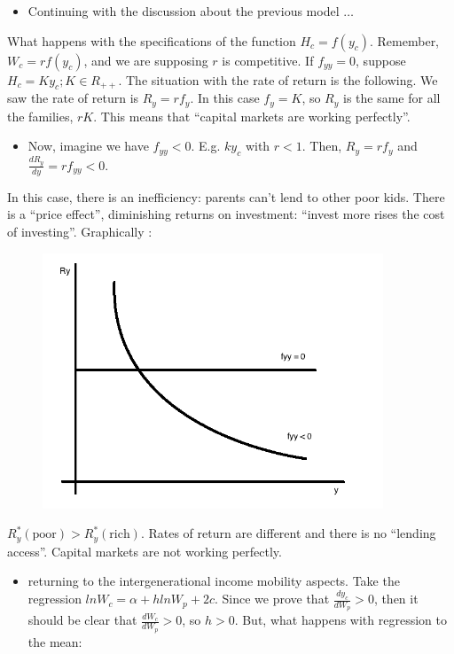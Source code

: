 \documentclass[14pt,notitlepage]{article}
\begin{document}
\begin{itemize}
    \begin{itemize}
    \item Continuing with the discussion about the previous model $\ldots$
    \end{itemize}
What happens with the specifications of the function $H_c = f(y_c)$. Remember, $W_c = r f(y_c)$, and we are supposing $r$ is competitive.
If $f_{yy} = 0$, suppose $H_c = K y_c ; K \in R_{++}$. The situation with the rate of return is the following. We saw the rate of return is $R_y = r f_y$. In this case $f_y = K$, so $R_y$ is the same for all the families, $rK$.
This means that ``capital markets are working perfectly''.
    \begin{itemize}
    \item Now, imagine we have $f_{yy} < 0$. E.g. $k y_c$ with $r < 1$. Then, $R_y = r f_y$ and $\frac{dR_y}{dy} = r f_{yy} < 0$.
    \end{itemize}
In this case, there is an inefficiency: parents can't lend to other poor kids. There is a ``price effect'', diminishing returns on investment: ``invest more rises the cost of investing''. Graphically :

\begin{center}
\begin{figure}[H] 
\caption{}
\centering
\includegraphics[width=4in, height=3in]{plot3.png}
\end{figure}
\end{center}


$R^{*}_y (\text{poor}) > R^{*}_y (\text{rich})$. Rates of return are different and there is no ``lending access''. Capital markets are not working perfectly.

    \begin{itemize}
    \item returning to the intergenerational income mobility aspects. Take the regression $ln W_c = \alpha + h ln W_p + 2 c$. Since we prove that $\frac{dy_c}{dW_p} > 0$, then it should be clear that $\frac{dW_c}{dW_p} > 0$, so $h > 0$. But, what happens with regression to the mean:


\end{itemize}
\end{itemize}
\end{document}
